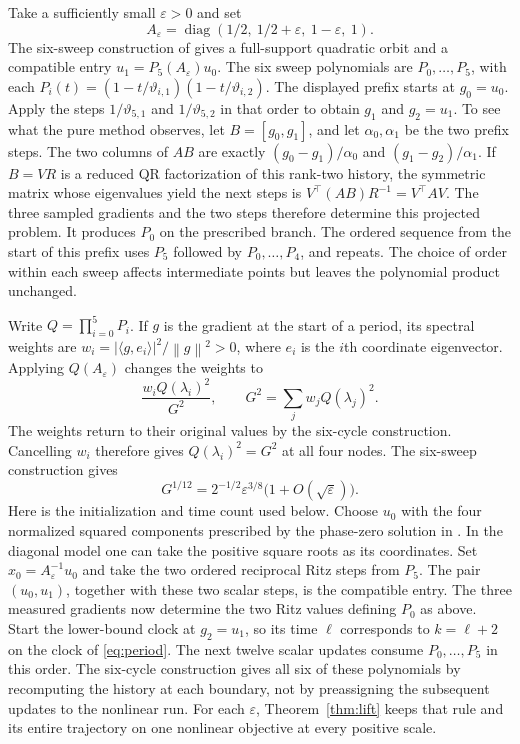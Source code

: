 \documentclass[11pt]{article}
\newcommand{\norm}[1]{\left\lVert#1\right\rVert}
\begin{document}
Take a sufficiently small \(\varepsilon>0\) and set
\[
 A_\varepsilon=\operatorname{diag}(1/2,\ 1/2+\varepsilon,\
                                  1-\varepsilon,\ 1).
\]
The six-sweep construction of \cite[Theorem 8.1 and Appendix R]{sharp} gives a full-support quadratic orbit and a
compatible entry \(u_1=P_5(A_\varepsilon)u_0\).
The six sweep polynomials are \(P_0,\ldots,P_5\), with each
\(P_i(t)=(1-t/\vartheta_{i,1})(1-t/\vartheta_{i,2})\).
The displayed prefix starts at \(g_0=u_0\). Apply the steps
\(1/\vartheta_{5,1}\) and \(1/\vartheta_{5,2}\) in that order to
obtain \(g_1\) and \(g_2=u_1\). To see what the pure
method observes, let \(B=[g_0,g_1]\), and let \(\alpha_0,\alpha_1\)
be the two prefix steps. The two columns of \(AB\) are exactly
\((g_0-g_1)/\alpha_0\) and \((g_1-g_2)/\alpha_1\). If \(B=VR\)
is a reduced QR factorization of this rank-two history, the symmetric
matrix whose eigenvalues yield the next steps is
\(V^\top(AB)R^{-1}=V^\top A V\). The three sampled gradients and the
two steps therefore determine this projected problem. It produces
\(P_0\) on the prescribed branch. The ordered sequence from the start
of this prefix uses \(P_5\)
followed by \(P_0,\ldots,P_4\), and repeats. The choice of order
within each sweep affects intermediate points but leaves the
polynomial product unchanged.

Write \(Q=\prod_{i=0}^{5}P_i\). If \(g\) is the gradient
at the start of a period, its spectral weights are
\(w_i=|\langle g,e_i\rangle|^2/\norm{g}^2>0\), where \(e_i\)
is the \(i\)th coordinate eigenvector. Applying \(Q(A_\varepsilon)\) changes
the weights to
\[
 \frac{w_i Q(\lambda_i)^2}{G^2},\qquad
 G^2=\sum_j w_j Q(\lambda_j)^2 .
\]
The weights return to their original values by the six-cycle
construction. Cancelling \(w_i\) therefore gives
\(Q(\lambda_i)^2=G^2\) at all four nodes. The six-sweep construction gives
\begin{equation}
 G^{1/12}
   = 2^{-1/2}\varepsilon^{3/8}
       \bigl(1+O(\sqrt\varepsilon)\bigr).
 \label{eq:factor}
\end{equation}
Here is the initialization and time count used below. Choose
\(u_0\) with the four normalized squared components prescribed by
the phase-zero solution in \cite[Appendix R]{sharp}. In the diagonal
model one can take the positive square roots as its coordinates.
Set \(x_0=A_\varepsilon^{-1}u_0\) and take the two ordered reciprocal
Ritz steps from \(P_5\). The pair \((u_0,u_1)\), together with these
two scalar steps, is the compatible entry. The three measured
gradients now determine the two Ritz values defining \(P_0\) as above.
Start the lower-bound clock at \(g_2=u_1\), so its time
\(\ell\) corresponds to \(k=\ell+2\) on the clock of
\eqref{eq:period}. The next twelve scalar updates consume
\(P_0,\ldots,P_5\) in this order. The six-cycle construction gives all six of these
polynomials by recomputing the history at each boundary, not by
preassigning the subsequent updates to the nonlinear run.
For each \(\varepsilon\), Theorem~\ref{thm:lift} keeps that rule and
its entire trajectory on one nonlinear objective at every positive
scale.
\end{document}
